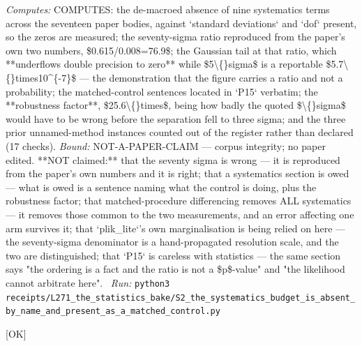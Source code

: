\begin{description}
\emph{Computes:} COMPUTES: the de-macroed absence of nine systematics terms across the seventeen paper bodies, against `standard deviations` and `dof` present, so the zeros are measured; the seventy-sigma ratio reproduced from the paper's own two numbers, \$0.615/0.008=76.9\$; the Gaussian tail at that ratio, which **underflows double precision to zero** while \$5\textbackslash\{\}sigma\$ is a reportable \$5.7\textbackslash\{\}times10\textasciicircum{}\{-7\}\$ --- the demonstration that the figure carries a ratio and not a probability; the matched-control sentences located in `P15` verbatim; the **robustness factor**, \$25.6\textbackslash\{\}times\$, being how badly the quoted \$\textbackslash\{\}sigma\$ would have to be wrong before the separation fell to three sigma; and the three prior unnamed-method instances counted out of the register rather than declared (17 checks).
 \emph{Bound:} NOT-A-PAPER-CLAIM --- corpus integrity; no paper edited. **NOT claimed:** that the seventy sigma is wrong --- it is reproduced from the paper's own numbers and it is right; that a systematics section is owed --- what is owed is a sentence naming what the control is doing, plus the robustness factor; that matched-procedure differencing removes ALL systematics --- it removes those common to the two measurements, and an error affecting one arm survives it; that `plik\_lite`'s own marginalisation is being relied on here --- the seventy-sigma denominator is a hand-propagated resolution scale, and the two are distinguished; that `P15` is careless with statistics --- the same section says "the ordering is a fact and the ratio is not a \$p\$-value" and "the likelihood cannot arbitrate here".
\ \emph{Run:} \texttt{python3 receipts/L271\_the\_statistics\_bake/S2\_the\_systematics\_budget\_is\_absent\_by\_name\_and\_present\_as\_a\_matched\_control.py}
\item[\label{rcpt:F1_the_outstanding_bake_list_was_surveyed_once_and_three_passes_were_needed_to_trust_it}\texttt{F1\_the\_outstanding\_bake\_list\_was\_surveyed\_once\_and\_three\_passes\_were\_needed\_to\_trust\_it}]\hfill\textsf{[OK]}\\

\end{description}
